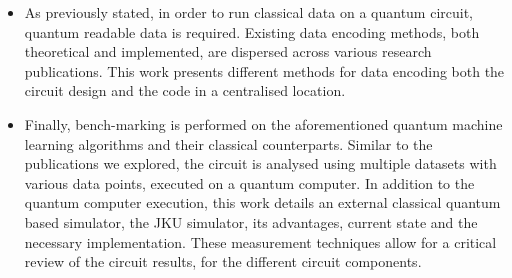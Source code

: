 \begin{itemize}
\item

As previously stated, in order to run classical data on a quantum circuit, quantum readable data is required. Existing data encoding methods, both theoretical and implemented, are dispersed across various research publications. This work presents different methods for data encoding both the circuit design and the code in a centralised location.


\end{itemize}


\begin{itemize}
\item

Finally, bench-marking is performed on the aforementioned quantum machine learning algorithms and their classical counterparts. Similar to the publications we explored, the circuit is analysed using multiple datasets with various data points, executed on a quantum computer. In addition to the quantum computer execution, this work details an external classical quantum based simulator, the JKU simulator, its advantages, current state and the necessary implementation. These measurement techniques allow for a critical review of the circuit results, for the different circuit components.

\end{itemize}